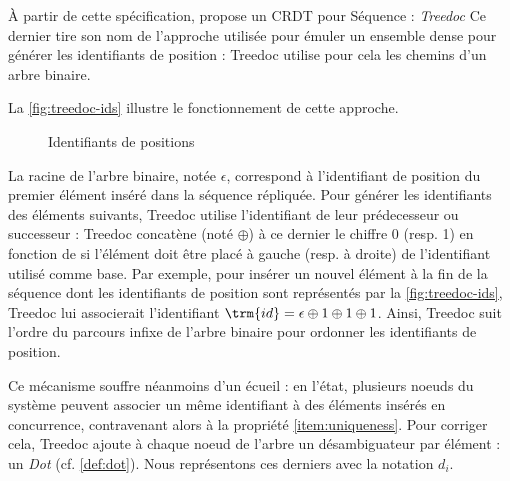 À partir de cette spécification, \citeauthor{2009-treedoc-preguica} propose un CRDT pour Séquence : \emph{Treedoc}
Ce dernier tire son nom de l'approche utilisée pour émuler un ensemble dense pour générer les identifiants de position : Treedoc utilise pour cela les chemins d'un arbre binaire.

La \autoref{fig:treedoc-ids} illustre le fonctionnement de cette approche.
\begin{figure}[!ht]

  \centering
  \caption{Identifiants de positions}
  \label{fig:treedoc-ids}
\end{figure}
La racine de l'arbre binaire, notée $\epsilon$, correspond à l'identifiant de position du premier élément inséré dans la séquence répliquée.
Pour générer les identifiants des éléments suivants, Treedoc utilise l'identifiant de leur prédecesseur ou successeur : Treedoc concatène (noté $\oplus$) à ce dernier le chiffre 0 (resp. 1) en fonction de si l'élément doit être placé à gauche (resp. à droite) de l'identifiant utilisé comme base.
Par exemple, pour insérer un nouvel élément à la fin de la séquence dont les identifiants de position sont représentés par la \autoref{fig:treedoc-ids}, Treedoc lui associerait l'identifiant $\trm{id} = \epsilon \oplus 1 \oplus 1 \oplus 1$.
Ainsi, Treedoc suit l'ordre du parcours infixe de l'arbre binaire pour ordonner les identifiants de position.

Ce mécanisme souffre néanmoins d'un écueil : en l'état, plusieurs noeuds du système peuvent associer un même identifiant à des éléments insérés en concurrence, contravenant alors à la propriété \ref{item:uniqueness}.
Pour corriger cela, Treedoc ajoute à chaque noeud de l'arbre un désambiguateur par élément : un \emph{Dot} (cf. \autoref{def:dot}).
Nous représentons ces derniers avec la notation $d_i$.

